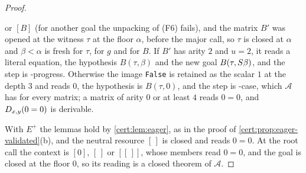 \begin{proof}
\begin{itemize}
or $[B]$ (for another goal the unpacking of (F6) fails), and the matrix $B'$ was opened
at the witness $\tau$ at the floor $\alpha$, before the major call, so $\tau$ is closed
at $\alpha$ and $\beta<\alpha$ is fresh for $\tau$, for $g$ and for $B$. If $B'$ has
arity $2$ and $u=2$, it reads a literal equation, the hypothesis $B(\tau,\beta)$ and
the new goal $B(\tau,S\beta)$, and the step is -progress. Otherwise the
image \texttt{False} is retained as the scalar $1$ at the depth $3$ and reads $0$, the
hypothesis is $B(\tau,0)$, and the step is -case, which $\mathcal A$ has
for every matrix; a matrix of arity $0$ or at least $4$ reads $0=0$, and
$D_{x,y}(0=0)$ is derivable.
\end{itemize}
With $E^{+}$ the lemmas hold by \cref{cert:lem:eager}, as in the proof of
\cref{cert:prop:eager-validated}(b), and the neutral resource $[\,]$ is closed and reads
$0=0$. At the root call the context is $[0]$, $[\,]$ or $[[\,]]$, whose members read
$0=0$, and the goal is closed at the floor $0$, so its reading is a closed theorem of
$\mathcal A$.


\end{proof}
